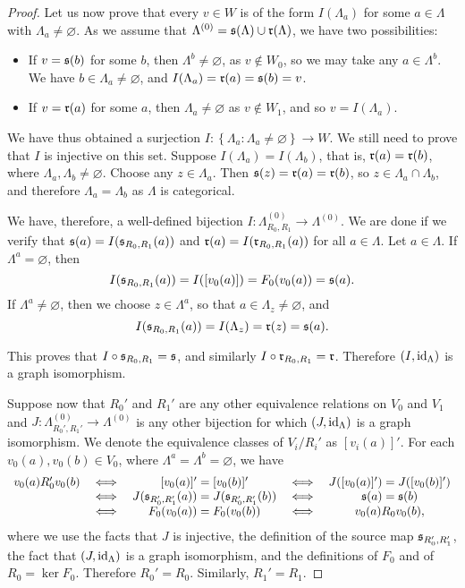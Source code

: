\begin{proof}
Let us now prove that every $v\in W$ is of the form $I(\Lambda_a)$ for some $a\in\Lambda$ with $\Lambda_a\neq\varnothing$. As we assume that $\Lambda^{(0)}=\operatorname{\mathfrak{s}}(\Lambda)\cup\operatorname{\mathfrak{r}}(\Lambda)$, we have two possibilities:
\begin{itemize}
    \item If $v=\operatorname{\mathfrak{s}}(b)$ for some $b$, then $\Lambda^b\neq\varnothing$, as $v\not\in W_0$, so we may take any $a\in\Lambda^b$. We have $b\in\Lambda_a\neq\varnothing$, and $I(\Lambda_a)=\operatorname{\mathfrak{r}}(a)=\operatorname{\mathfrak{s}}(b)=v$.
    \item If $v=\operatorname{\mathfrak{r}}(a)$ for some $a$, then $\Lambda_a\neq\varnothing$ as $v\not\in W_1$, and so $v=I(\Lambda_a)$.
\end{itemize}

We have thus obtained a surjection $I\colon\left\{\Lambda_a:\Lambda_a\neq\varnothing\right\}\to W$. We still need to prove that $I$ is injective on this set. Suppose $I(\Lambda_a)=I(\Lambda_b)$, that is, $\operatorname{\mathfrak{r}}(a)=\operatorname{\mathfrak{r}}(b)$, where $\Lambda_a,\Lambda_b\neq\varnothing$. Choose any $z\in\Lambda_a$. Then $\operatorname{\mathfrak{s}}(z)=\operatorname{\mathfrak{r}}(a)=\operatorname{\mathfrak{r}}(b)$, so $z\in\Lambda_a\cap\Lambda_b$, and therefore $\Lambda_a=\Lambda_b$ as $\Lambda$ is categorical.

We have, therefore, a well-defined bijection $I\colon\Lambda_{R_0,R_1}^{(0)}\to\Lambda^{(0)}$. We are done if we verify that $\operatorname{\mathfrak{s}}(a)=I(\operatorname{\mathfrak{s}}_{R_0,R_1}(a))$ and $\operatorname{\mathfrak{r}}(a)=I(\operatorname{\mathfrak{r}}_{R_0,R_1}(a))$ for all $a\in\Lambda$. Let $a\in\Lambda$. If $\Lambda^a=\varnothing$, then
\[I(\operatorname{\mathfrak{s}}_{R_0,R_1}(a))=I([v_0(a)])=F_0(v_0(a))=\operatorname{\mathfrak{s}}(a).\]
If $\Lambda^a\neq\varnothing$, then we choose $z\in\Lambda^a$, so that $a\in\Lambda_z\neq\varnothing$, and
\[I(\operatorname{\mathfrak{s}}_{R_0,R_1}(a))=I(\Lambda_z)=\operatorname{\mathfrak{r}}(z)=\operatorname{\mathfrak{s}}(a).\]

This proves that $I\circ\operatorname{\mathfrak{s}}_{R_0,R_1}=\operatorname{\mathfrak{s}}$, and similarly $I\circ\operatorname{\mathfrak{r}}_{R_0,R_1}=\operatorname{\mathfrak{r}}$. Therefore $(I,\operatorname{id}_\Lambda)$ is a graph isomorphism.

Suppose now that $R_0'$ and $R_1'$ are any other equivalence relations on $V_0$ and $V_1$ and $J\colon\Lambda_{R_0',R_1'}^{(0)}\to\Lambda^{(0)}$ is any other bijection for which $(J,\operatorname{id}_{\Lambda})$ is a graph isomorphism. We denote the equivalence classes of $V_i/R_i'$ as $[v_i(a)]'$. For each $v_0(a),v_0(b)\in V_0$, where $\Lambda^a=\Lambda^b=\varnothing$, we have
\[\begin{array}{c c c c c}
    v_0(a)R_0'v_0(b)&\iff&[v_0(a)]'=[v_0(b)]'&\iff& J([v_0(a)]')=J([v_0(b)]')\\
    &\iff& J(\operatorname{\mathfrak{s}}_{R_0',R_1'}(a))=J(\operatorname{\mathfrak{s}}_{R_0',R_1'}(b))&\iff& \operatorname{\mathfrak{s}}(a)=\operatorname{\mathfrak{s}}(b)\\
    &\iff& F_0(v_0(a))=F_0(v_0(b))&\iff& v_0(a)R_0 v_0(b),
\end{array}\]
where we use the facts that $J$ is injective, the definition of the source map $\operatorname{\mathfrak{s}}_{R_0',R_1'}$, the fact that $(J,\operatorname{id}_{\Lambda})$ is a graph isomorphism, and the definitions of $F_0$ and of $R_0=\ker F_0$. Therefore $R_0'=R_0$. Similarly, $R_1'=R_1$.\qedhere
\end{proof}


